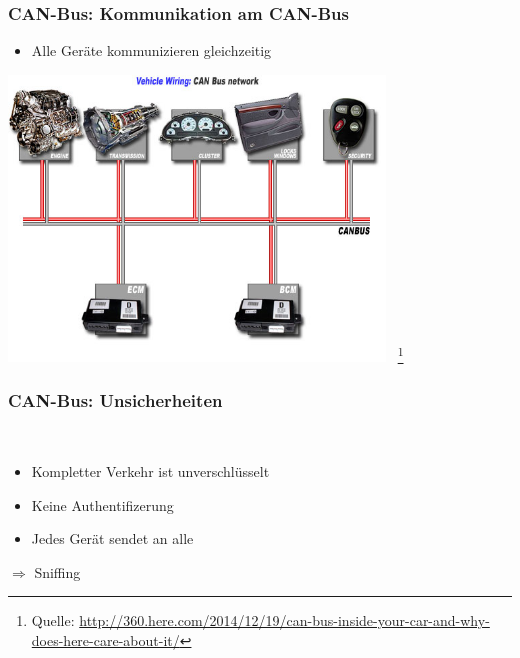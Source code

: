 \documentclass[t]{beamer}
\begin{document}
\begin{frame}
	\frametitle{CAN-Bus: Kommunikation am CAN-Bus}
	\begin{itemize}
        \item Alle Geräte kommunizieren gleichzeitig
	\end{itemize}
    \begin{center}
        \includegraphics[width=0.75\textwidth]{pic/diag_canbus2.jpg} \ \footnote{Quelle: \href{http://360.here.com/2014/12/19/can-bus-inside-your-car-and-why-does-here-care-about-it/}{http://360.here.com/2014/12/19/can-bus-inside-your-car-and-why-does-here-care-about-it/}}\
    \end{center}
\end{frame}

\begin{frame}
	\frametitle{CAN-Bus: Unsicherheiten}
    \ \par
	\begin{itemize}
   		\item Kompletter Verkehr ist unverschlüsselt
   	\end{itemize}
   	\begin{itemize}
		\item Keine Authentifizerung
	\end{itemize}
   	\begin{itemize}
		\item Jedes Gerät sendet an alle
	\end{itemize}

    $\Rightarrow$ Sniffing
\end{frame}
\end{document}
